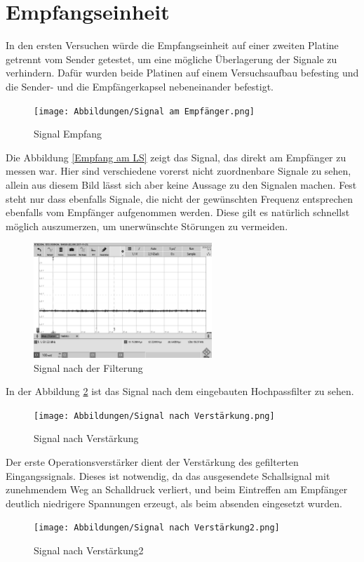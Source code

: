 \section{Empfangseinheit}
In den ersten Versuchen würde die Empfangseinheit auf einer zweiten Platine getrennt vom Sender getestet, um eine mögliche Überlagerung der Signale zu verhindern. Dafür wurden beide Platinen auf einem Versuchsaufbau befesting und die Sender- und die Empfängerkapsel nebeneinander befestigt.
\begin{figure}[H]
\texttt{[image: Abbildungen/Signal am Empfänger.png]}\caption{Signal Empfang}\label{fig:Empfang am LS}
\end{figure}
Die Abbildung \ref{Empfang am LS} zeigt das Signal, das direkt am Empfänger zu messen war. Hier sind verschiedene vorerst nicht zuordnenbare Signale zu sehen, allein aus diesem Bild lässt sich aber keine Aussage zu den Signalen machen. Fest steht nur dass ebenfalls Signale, die nicht der gewünschten Frequenz entsprechen ebenfalls vom Empfänger aufgenommen werden. Diese gilt es natürlich schnellst möglich auszumerzen, um unerwünschte Störungen zu vermeiden.
\begin{figure}[H]
\includegraphics[width=0.6\textwidth, draft]{Abbildungen/Signal nach der Filterung.png}\caption{Signal nach der Filterung}\label{fig:Filterung}
\end{figure}
In der Abbildung \ref{fig:Filterung} ist das Signal nach dem eingebauten Hochpassfilter zu sehen.
\begin{figure}[H]
\texttt{[image: Abbildungen/Signal nach Verstärkung.png]}\caption{Signal nach Verstärkung}\label{fig:Verstaerkung}
\end{figure}
Der erste Operationsverstärker dient der Verstärkung des gefilterten Eingangssignals. Dieses ist notwendig, da das ausgesendete Schallsignal mit zunehmendem Weg an Schalldruck verliert, und beim Eintreffen am Empfänger deutlich niedrigere Spannungen erzeugt, als beim absenden eingesetzt wurden. 
\begin{figure}[H]
\texttt{[image: Abbildungen/Signal nach Verstärkung2.png]}\caption{Signal nach Verstärkung2}\label{fig:Verstaerkung2}
\end{figure}
